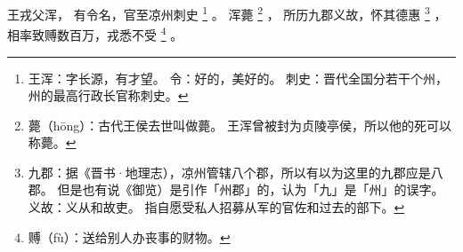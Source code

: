 
\switchcolumn*[\section{}]

王戎父浑，
有令名，官至凉州刺史%
\footnote{%
    王浑：字长源，有才望。
    令：好的，美好的。
    刺史：晋代全国分若干个州，州的最高行政长官称刺史。
}%
。
浑薨%
\footnote{%
    薨（hōng）：古代王侯去世叫做薨。
                王浑曾被封为贞陵亭侯，所以他的死可以称薨。
}%
，
所历九郡义故，怀其德惠%
\footnote{%
    九郡：据《晋书·地理志），凉州管辖八个郡，所以有以为这里的九郡应是八郡。
          但是也有说《御览）是引作「州郡」的，认为「九」是「州」的误字。
    义故：义从和故吏。
          指自愿受私人招募从军的官佐和过去的部下。
}%
，
相率致赙数百万，戎悉不受%
\footnote{%
    赙（fù）：送给别人办丧事的财物。
}%
。

\switchcolumn


